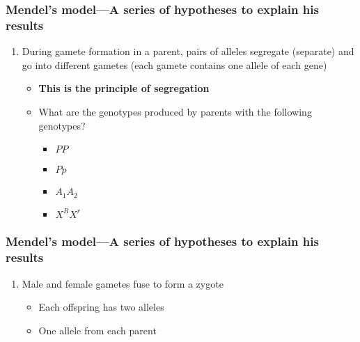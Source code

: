 \begin{frame}
    \frametitle{Mendel's model---A series of hypotheses to explain his results}
    \begin{enumerate}[<+->]
        \addtocounter{enumi}{4}
        \item During gamete formation in a parent, pairs of alleles segregate
            (separate) and go into different gametes (each gamete contains one
            allele of each gene)
            \begin{itemize}
                \item \textbf{This is the principle of segregation}
                \item What are the  genotypes produced
                    by parents with the following genotypes?
                    \begin{itemize}
                        \item $PP$ \hspace{9mm}
                            \vspace{3mm}
                        \item $Pp$ \hspace{10mm}
                            \vspace{3mm}
                        \item $A_{1}A_{2}$ \hspace{6mm}
                            \vspace{3mm}
                        \item $X^{R}X^{r}$ \hspace{5mm}
                    \end{itemize}
            \end{itemize}
    \end{enumerate}
\end{frame}

\begin{frame}
    \frametitle{Mendel's model---A series of hypotheses to explain his results}
    \begin{enumerate}[<+->]
        \addtocounter{enumi}{5}
        \item Male and female gametes fuse to form a zygote
            \begin{itemize}
                \item Each offspring has two alleles
                \item One allele from each parent
            \end{itemize}
    \end{enumerate}
\end{frame}

